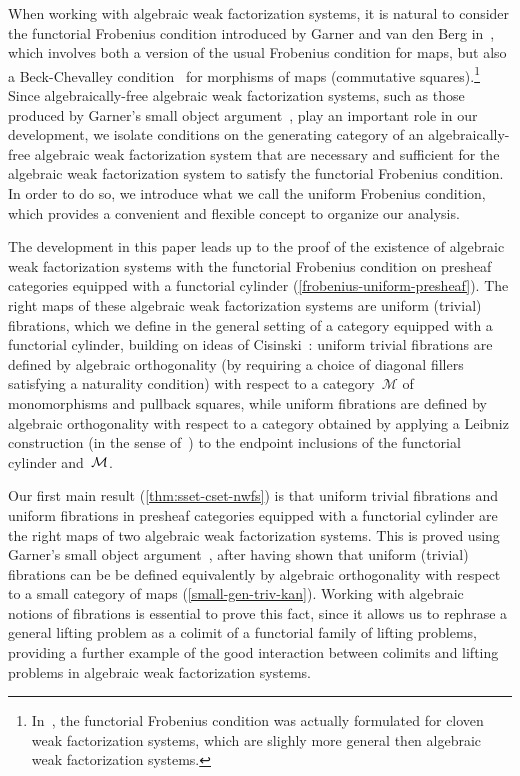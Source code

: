 \documentclass[reqno,10pt,a4paper,oneside,draft]{amsart}
\begin{document}
When working with algebraic weak factorization systems, it is natural to consider the functorial
Frobenius condition introduced by Garner and van den Berg in~\cite{garner:topological-simplicial}, which involves
both a version of the usual Frobenius condition for maps, but  also a Beck-Chevalley condition~\cite{benabou-descente,lawvere-equality} for morphisms of maps (\ie commutative squares).\footnote{In~\cite{garner:topological-simplicial},
the functorial Frobenius condition was actually formulated for cloven weak factorization systems,
which are slighly more general then algebraic weak factorization systems.} Since algebraically-free algebraic 
weak factorization systems, such as those produced by Garner's small object
argument~\cite{garner:small-object-argument}, 
play an important role in our development, we  
isolate conditions on the generating category of an algebraically-free algebraic weak factorization system that are necessary and sufficient for the algebraic weak factorization system to satisfy the functorial Frobenius condition. 
In order to do so, we introduce what we call the uniform Frobenius condition, which provides a convenient and flexible
concept to organize our analysis.

The development in this paper leads up to the proof of the existence of algebraic weak factorization systems 
with the functorial Frobenius condition on presheaf categories equipped with a functorial cylinder  (\cref{frobenius-uniform-presheaf}). The right maps of these algebraic
weak factorization systems are uniform (trivial) fibrations, which we define  in the general setting of a  category equipped with a functorial cylinder, building on
ideas of Cisinski~\cite{cisinski-asterisque}:
uniform trivial fibrations are defined by algebraic  orthogonality (\ie by requiring a choice
of diagonal fillers satisfying a naturality condition) with respect to a category~$\mathcal{M}$ of monomorphisms and pullback squares, while uniform fibrations are defined by algebraic orthogonality  with respect to a category obtained by applying a Leibniz construction 
(in the sense of~\cite{riehl-verity:reedy}) to the endpoint inclusions of the functorial cylinder and~$\cal{M}$.

Our first main result (\cref{thm:sset-cset-nwfs}) is that uniform trivial fibrations and uniform fibrations in presheaf categories equipped with a functorial cylinder
are the right maps of two algebraic weak factorization systems.
This is proved using Garner's small object argument~\cite{garner:small-object-argument}, after having shown that uniform (trivial) fibrations can be be defined equivalently by algebraic orthogonality with respect to a small category of maps (\cref{small-gen-triv-kan}).
Working with algebraic notions of fibrations is essential to prove this fact, since it allows us to rephrase a general lifting problem as a colimit of a functorial family of lifting problems, providing
a further example of the good interaction between colimits and lifting problems
in algebraic weak factorization systems.
\end{document}
